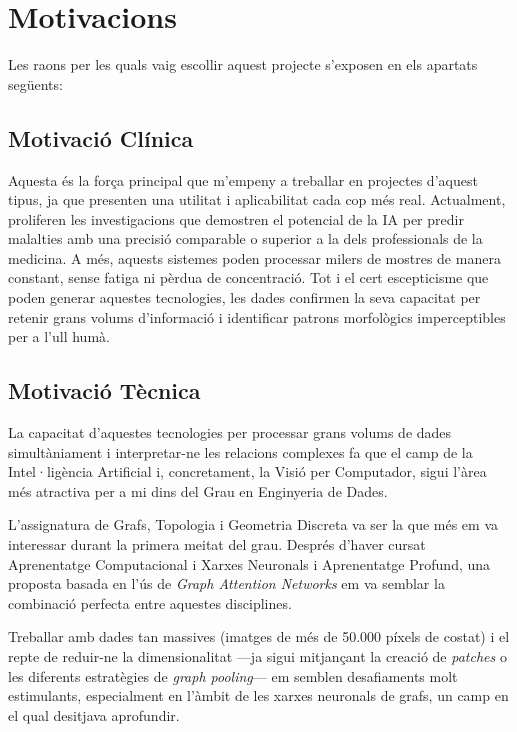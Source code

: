 ﻿\documentclass[10pt,a4paper,twocolumn,twoside]{article}
\begin{document}
\section{Motivacions}

Les raons per les quals vaig escollir aquest projecte s'exposen en els apartats següents:

\subsection{Motivació Clínica}

Aquesta és la força principal que m'empeny a treballar en projectes d'aquest tipus, ja que presenten una utilitat i aplicabilitat cada cop més real. Actualment, proliferen les investigacions que demostren el potencial de la IA per predir malalties amb una precisió comparable o superior a la dels professionals de la medicina. A més, aquests sistemes poden processar milers de mostres de manera constant, sense fatiga ni pèrdua de concentració. Tot i el cert escepticisme que poden generar aquestes tecnologies, les dades confirmen la seva capacitat per retenir grans volums d'informació i identificar patrons morfològics imperceptibles per a l'ull humà.

\subsection{Motivació Tècnica}

La capacitat d'aquestes tecnologies per processar grans volums de dades simultàniament i interpretar-ne les relacions complexes fa que el camp de la Intel·ligència Artificial i, concretament, la Visió per Computador, sigui l'àrea més atractiva per a mi dins del Grau en Enginyeria de Dades.

L'assignatura de Grafs, Topologia i Geometria Discreta va ser la que més em va interessar durant la primera meitat del grau. Després d'haver cursat Aprenentatge Computacional i Xarxes Neuronals i Aprenentatge Profund, una proposta basada en l'ús de \textit{Graph Attention Networks} em va semblar la combinació perfecta entre aquestes disciplines.

Treballar amb dades tan massives (imatges de més de 50.000 píxels de costat) i el repte de reduir-ne la dimensionalitat —ja sigui mitjançant la creació de \textit{patches} o les diferents estratègies de \textit{graph pooling}— em semblen desafiaments molt estimulants, especialment en l'àmbit de les xarxes neuronals de grafs, un camp en el qual desitjava aprofundir.
\end{document}
